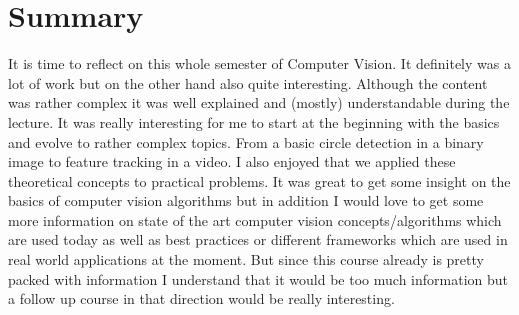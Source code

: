 \chapter*{Summary}

It is time to reflect on this whole semester of Computer Vision. It definitely was a lot of work but on the other hand also quite interesting. Although the content was rather complex it was well explained and (mostly) understandable during the lecture. It was really interesting for me to start at the beginning with the basics and evolve to rather complex topics. From a basic circle detection in a binary image to feature tracking in a video. I also enjoyed that we applied these theoretical concepts to practical problems. It was great to get some insight on the basics of computer vision algorithms but in addition I would love to get some more information on state of the art computer vision concepts/algorithms which are used today as well as best practices or different frameworks which are used in real world applications at the moment. But since this course already is pretty packed with information I understand that it would be too much information but a follow up course in that direction would be really interesting.